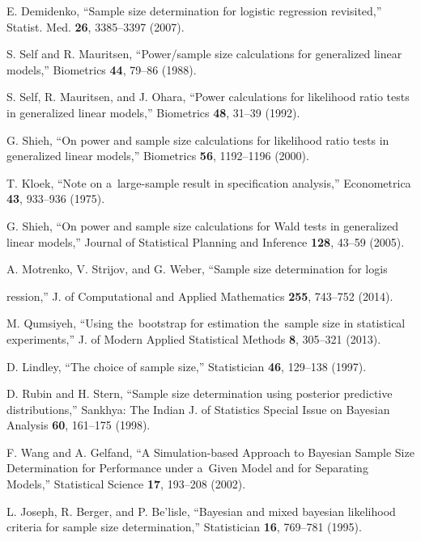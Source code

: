 \documentclass[
11pt,%
tightenlines,%
twoside,%
onecolumn,%
nofloats,%
nobibnotes,%
nofootinbib,%
superscriptaddress,%
noshowpacs,%
centertags]%
{revtex4}
\begin{document}
\begin{thebibliography}{}
    E. Demidenko, ``Sample size determination for logistic regression revisited,'' Statist. Med. \textbf{26}, 3385--3397 (2007).

    S. Self and R. Mauritsen, ``Power/sample size calculations  for generalized linear models,'' Biometrics \textbf{44}, 79--86 (1988).

    S. Self, R. Mauritsen, and J. Ohara, ``Power calculations for likelihood ratio tests in generalized linear models,'' Biometrics \textbf{48}, 31--39 (1992).

    G. Shieh, ``On power and sample size calculations for likelihood ratio tests in generalized linear models,'' Biometrics \textbf{56}, 1192--1196 (2000).

    T. Kloek, ``Note on a~large-sample result in specification analysis,'' Econometrica \textbf{43}, 933--936 (1975).

    G. Shieh, ``On power and sample size calculations for Wald tests in generalized linear models,'' Journal of Statistical Planning and Inference \textbf{128}, 43--59 (2005).

    A. Motrenko, V. Strijov, and G. Weber, ``Sample size determination for logis

    ression,'' J. of Computational and Applied Mathematics \textbf{255}, 743--752 (2014).

    M. Qumsiyeh, ``Using the~bootstrap for estimation the~sample size in statistical experiments,'' J. of Modern Applied Statistical Methods \textbf{8}, 305--321 (2013).

    D. Lindley, ``The choice of sample size,'' Statistician \textbf{46}, 129--138 (1997).

    D. Rubin and H. Stern, ``Sample size determination using posterior predictive  distributions,'' Sankhya: The Indian J.
     of Statistics Special Issue on Bayesian Analysis \textbf{60}, 161--175 (1998).

    F. Wang and A. Gelfand, ``A Simulation-based Approach to Bayesian Sample Size
    Determination for Performance under a~Given Model and for Separating Models,'' Statistical Science \textbf{17}, 193--208 (2002).

    L. Joseph, R. Berger, and P. Be'lisle, ``Bayesian and mixed bayesian likelihood criteria for sample size
    determination,'' Statistician \textbf{16}, 769--781 (1995).


\end{thebibliography}
\end{document}
